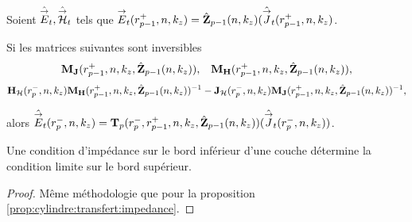     \begin{prop}%
      \label{prop:cylindre:relevement:impedance}

      Soient \(\hat{{\overset{\rightarrow}{E}}}_t,\hat{{\overset{\rightarrow}{\mathcal{H}}}}_t\) tels que \({\overset{\rightarrow}{E}}_t(r_{p-1}^+,n,k_z) = \hat{\mathbf{Z}}_{p-1}(n,k_z)(\hat{{\overset{\rightarrow}{J}}}_t(r_{p-1}^+,n,k_z)\).

      Si les matrices suivantes sont inversibles
      \begin{align*}
        \mathbf{M}_{\mathbf{J}}(r_{p-1}^+,n,k_z,\hat{\mathbf{Z}}_{p-1}(n,k_z)), && \mathbf{M}_{\mathbf{H}}(r_{p-1}^+,n,k_z,\hat{\mathbf{Z}}_{p-1}(n,k_z)),
      \end{align*}
      \begin{align*}
        \mathbf{H}_{\mathcal{H}}(r_{p}^-,n,k_z)\mathbf{M}_{\mathbf{H}}(r_{p-1}^+,n,k_z,\hat{\mathbf{Z}}_{p-1}(n,k_z))^{-1} - \mathbf{J}_{\mathcal{H}}(r_{p}^-,n,k_z)\mathbf{M}_{\mathbf{J}}(r_{p-1}^+,n,k_z,\hat{\mathbf{Z}}_{p-1}(n,k_z))^{-1},
      \end{align*}

      alors \(\hat{{\overset{\rightarrow}{E}}}_t(r_{p}^-,n,k_z) = \mathbf{T}_p(r_p^-,r_{p-1}^+,n,k_z,\hat{\mathbf{Z}}_{p-1}(n,k_z))(\hat{{\overset{\rightarrow}{J}}}_t(r_{p}^-,n,k_z))\).

      Une condition d'impédance sur le bord inférieur d'une couche détermine la condition limite sur le bord supérieur.
    \end{prop}

    \begin{proof}
      Même méthodologie que pour la proposition \ref{prop:cylindre:transfert:impedance}.
    \end{proof}

